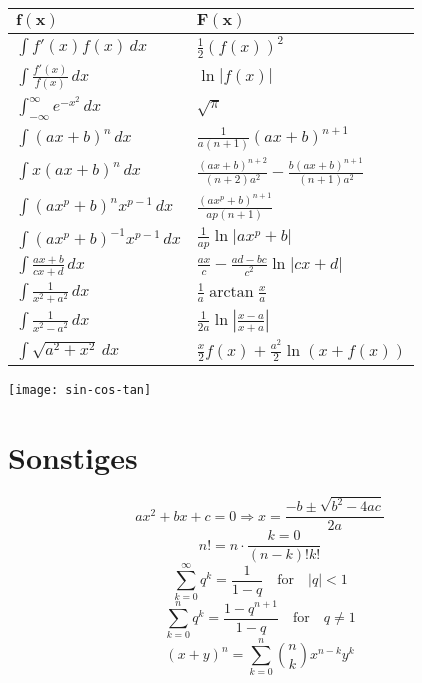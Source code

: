 \begin{center}
  \begin{tabularx}{\linewidth}{>{\centering\arraybackslash}X>{\centering\arraybackslash}X}
    $\mathbf{f(x)}$                        & $\mathbf{F(x)}$                                                  \\
    \midrule
    $\int f'(x) f(x) \, dx$                & $\frac{1}{2}(f(x))^2$                                            \\
    $\int \frac{f'(x)}{f(x)} \, dx$        & $\ln|f(x)|$                                                      \\
    $\int_{-\infty}^\infty e^{-x^2} \, dx$ & $\sqrt{\pi}$                                                     \\
    $\int (ax+b)^n \, dx$                  & $\frac{1}{a(n+1)}(ax+b)^{n+1}$                                   \\
    $\int x(ax+b)^n \, dx$                 & $\frac{(ax+b)^{n+2}}{(n+2)a^2} - \frac{b(ax+b)^{n+1}}{(n+1)a^2}$ \\
    $\int (ax^p+b)^n x^{p-1} \, dx$        & $\frac{(ax^p+b)^{n+1}}{ap(n+1)}$                                 \\
    $\int (ax^p + b)^{-1} x^{p-1} \, dx$   & $\frac{1}{ap} \ln |ax^p + b|$                                    \\
    $\int \frac{ax+b}{cx+d} \, dx$         & $\frac{ax}{c} - \frac{ad-bc}{c^2} \ln |cx +d|$                   \\
    $\int \frac{1}{x^2+a^2} \, dx$         & $\frac{1}{a} \arctan \frac{x}{a}$                                \\
    $\int \frac{1}{x^2 - a^2} \, dx$       & $\frac{1}{2a} \ln\left| \frac{x-a}{x+a} \right|$                 \\
    $\int \sqrt{a^2+x^2} \, dx $           & $\frac{x}{2}f(x) + \frac{a^2}{2}\ln(x+f(x))$                     \\
    \bottomrule
  \end{tabularx}
\end{center}

\texttt{[image: sin-cos-tan]}

\section{Sonstiges}
\[ax^2 + bx + c = 0 \Rightarrow x = \frac{-b \pm \sqrt{b^2 - 4ac}}{2a}\]
\[n! = n \cdot \frac{k=0}{(n - k)!k!}\]
\[\sum_{k=0}^\infty q^k = \frac{1}{1 - q} \quad \text{for} \quad |q| < 1\]
\[\sum_{k=0}^n q^k = \frac{1 - q^{n+1}}{1 - q} \quad \text{for} \quad q \neq 1\]
\[(x + y)^n = \sum_{k=0}^n \binom{n}{k} x^{n-k} y^k\]
\newpage
